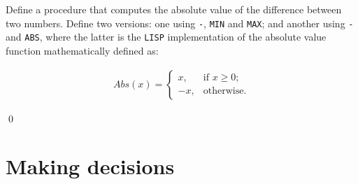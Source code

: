 \documentclass[a4paper,11pt]{article}
\begin{document}
\begin{uexercise}\label{exabs}
Define a procedure that computes the absolute value of the difference between two numbers. Define two versions: one using  \Verb+-+, \Verb+MIN+ and \Verb+MAX+; and another using \Verb+-+ and \Verb+ABS+, where the latter is the \Verb+LISP+ implementation of the absolute value function mathematically defined as:  


\begin{align*}
Abs(x) =  
\begin{cases}
x, & \text{if } x\geq 0;\\
-x, & \text{otherwise.}
\end{cases}
\end{align*}

\qed
\end{uexercise}

\noindent \hrulefill

\newpage

\section{Making decisions}
\end{document}
